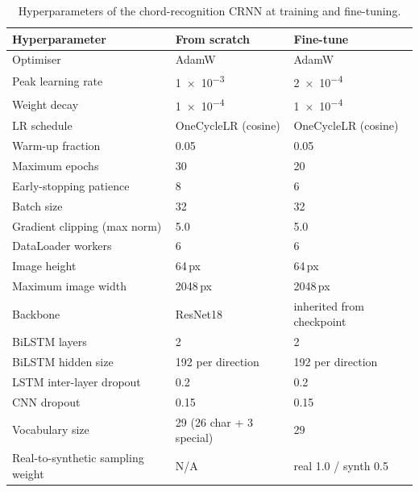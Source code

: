 \begin{table}[H]
\centering\small
\setlength{\tabcolsep}{5pt}
\renewcommand{\arraystretch}{1.30}
\begin{tabularx}{\textwidth}{@{} L l l @{}}
\toprule
\textbf{Hyperparameter} & \textbf{From scratch} & \textbf{Fine-tune} \\
\midrule
Optimiser                        & AdamW               & AdamW \\
Peak learning rate                & \num{1e-3}          & \num{2e-4} \\
Weight decay                      & \num{1e-4}          & \num{1e-4} \\
LR schedule                       & OneCycleLR (cosine) & OneCycleLR (cosine) \\
Warm-up fraction                  & 0.05                & 0.05 \\
Maximum epochs                    & 30                  & 20 \\
Early-stopping patience           & 8                   & 6 \\
Batch size                        & 32                  & 32 \\
Gradient clipping (max norm)      & 5.0                 & 5.0 \\
DataLoader workers                & 6                   & 6 \\
Image height                      & 64\,px              & 64\,px \\
Maximum image width               & 2048\,px            & 2048\,px \\
Backbone                          & ResNet18            & inherited from checkpoint \\
BiLSTM layers                     & 2                   & 2 \\
BiLSTM hidden size                & 192 per direction   & 192 per direction \\
LSTM inter-layer dropout          & 0.2                 & 0.2 \\
CNN dropout                       & 0.15                & 0.15 \\
Vocabulary size                   & 29 (26 char + 3 special) & 29 \\
Real-to-synthetic sampling weight & N/A                 & real 1.0 / synth 0.5 \\
\bottomrule
\end{tabularx}
\caption{Hyperparameters of the chord-recognition CRNN at training and fine-tuning.}
\label{tab:hyperparams-chord}
\end{table}


